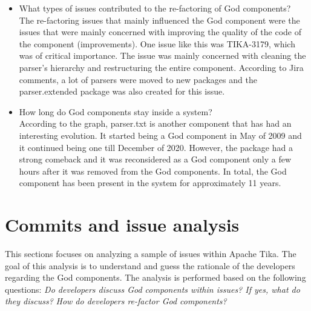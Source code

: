 \documentclass{article}
\begin{document}
\begin{itemize}
    \item	What types of issues contributed to the re-factoring of God components?\\
    The re-factoring issues that mainly influenced the God component were  the issues that were mainly concerned with improving the quality of the code of the component (improvements). One issue like this was TIKA-3179, which was of critical importance. The issue was mainly concerned with cleaning the parser’s hierarchy and restructuring the entire component. According to Jira comments, a lot of parsers were moved to new packages and the parser.extended package was also created for this issue.\\
    \item How long do God components stay inside a system?\\
    According to the graph, parser.txt is another component that has had an interesting evolution. It started being a God component in May of 2009 and it continued being one till December of 2020. However, the package had a strong comeback and it was reconsidered as a God component only a few hours after it was removed from the God components. In total, the God component has been present in the system for approximately 11 years.
    
\end{itemize}
\pagebreak
\section{Commits and issue analysis}
This sections focuses on analyzing a sample of issues within Apache Tika. The goal of this analysis is to understand and guess the rationale of the developers regarding the God components. The analysis is performed based on the following questions: 
\textit{Do developers discuss God components within issues? If yes, what do they discuss?}
\textit{ How do developers re-factor God components?}




\end{document}
